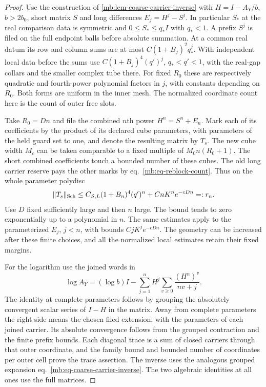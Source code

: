 \documentclass[11pt,letterpaper,reqno]{amsart}
\numberwithin{equation}{section}
\renewcommand{\eqref}[1]{\textup{eq.~\ref{#1}}}
\theoremstyle{definition}
\theoremstyle{remark}
\begin{document}
\begin{proof}
Use the construction of \cref{mb:lem-coarse-carrier-inverse} with \(H=I-A_Y/b\), \(b>2b_0\), short matrix \(S\) and long differences \(E_j=H^j-S^j\). In particular \(S_*\) at the real comparison data is symmetric and \(0\le S_*\le q_*I\) with \(q_*<1\). A prefix \(S^j\) is filed on the full endpoint balls before absolute summation. At a common real datum its row and column sums are at most \(C(1+B_j)^2 q_*^j\). With independent local data before the sums use \(C(1+B_j)^4(q')^j\), \(q_*<q'<1\), with the real-gap collars and the smaller complex tube there. For fixed \(R_0\) these are respectively quadratic and fourth-power polynomial factors in \(j\), with constants depending on \(R_0\). Both forms are uniform in the inner mesh. The normalized coordinate count here is the count of outer free slots.

Take \(R_0=D n\) and file the combined \(n\)th power \(H^n=S^n+E_n\). Mark each of its coefficients by the product of its declared cube parameters, with parameters of the held guard set to one, and denote the resulting matrix by \(T_s\). The new cube width \(M_c\) can be taken comparable to a fixed multiple of \(M_0n(R_0+1)\). The short combined coefficients touch a bounded number of these cubes. The old long carrier reserve pays the other marks by \eqref{mb:eq-reblock-count}. Thus on the whole parameter polydisc
\[
 \|T_s\|_{\rm Sch}\le
   C_{\mathcal S,L}(1+B_n)^4(q')^n+CnK^n e^{-cDn}=:r_n .
\]
Use \(D\) fixed sufficiently large and then \(n\) large. The bound tends to zero exponentially up to a polynomial in \(n\). The same estimates apply to the parameterized \(E_j\), \(j<n\), with bounds \(CjK^j e^{-cDn}\). The geometry can be increased after these finite choices, and all the normalized local estimates retain their fixed margins.

For the logarithm use the joined words in
\begin{equation}\label{mb:eq-filed-log}
 \log A_Y=(\log b)I-\sum_{j=1}^{n}H^j
                         \sum_{v\ge0}\frac{(H^n)^v}{nv+j}.
\end{equation}
The identity at complete parameters follows by grouping the absolutely convergent scalar series of \(I-H\) in the matrix. Away from complete parameters the right side means the chosen filed extension, with the parameters of each joined carrier. Its absolute convergence follows from the grouped contraction and the finite prefix bounds. Each diagonal trace is a sum of closed carriers through that outer coordinate, and the family bound and bounded number of coordinates per outer cell prove the trace assertion. The inverse uses the analogous grouped expansion \eqref{mb:eq-coarse-carrier-inverse}. The two algebraic identities at all ones use the full matrices.


\end{proof}
\end{document}
